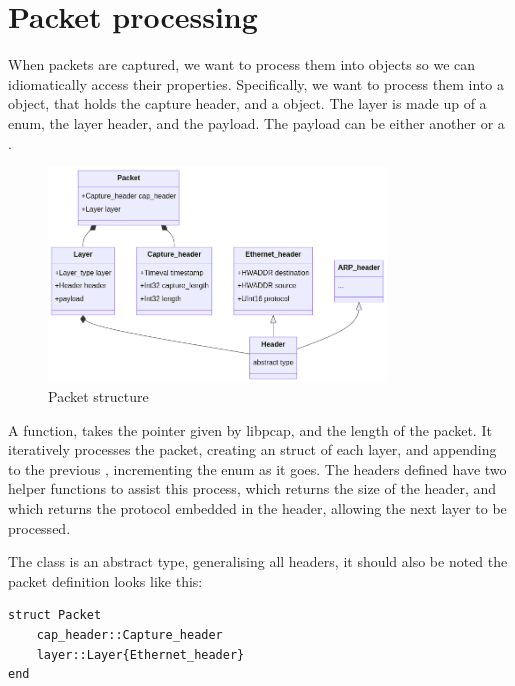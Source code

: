 \section{Packet processing}
\label{sec:packet_processing}

When packets are captured, we want to process them into objects so we can idiomatically access their properties. Specifically, we want to process them into a  object, that holds the capture header, and a  object. The layer is made up of a  enum, the layer header, and the payload. The payload can be either another  or a .

\begin{figure}[!h]
    \centering
    \includegraphics[width=0.8\textwidth]{fig/packet_structure.png}
    \caption{Packet structure}
    \label{fig:packet_structure}
\end{figure}

A function,  takes the pointer given by libpcap, and the length of the packet. It iteratively processes the packet, creating an  struct of each layer, and appending to the previous , incrementing the  enum as it goes. The headers defined have two helper functions to assist this process,  which returns the size of the header, and  which returns the protocol embedded in the header, allowing the next layer to be processed.

The  class is an abstract type, generalising all headers, it should also be noted the packet definition looks like this:

\begin{lstlisting}[language=JuliaLocal, style=julia]
struct Packet
    cap_header::Capture_header
    layer::Layer{Ethernet_header}
end
\end{lstlisting}

